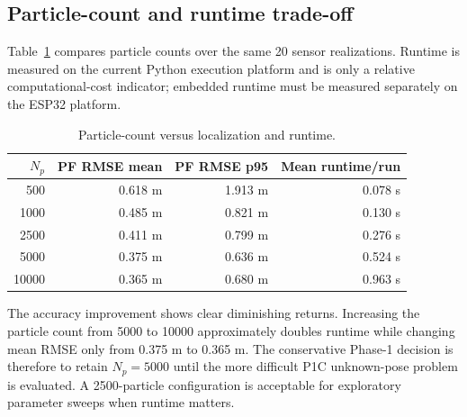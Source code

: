 \subsection{Particle-count and runtime trade-off}
Table~\ref{tab:p1b_particles} compares particle counts over the same 20 sensor realizations. Runtime is measured on the current Python execution platform and is only a relative computational-cost indicator; embedded runtime must be measured separately on the ESP32 platform.
\begin{table}[ht]
\centering
\caption{Particle-count versus localization and runtime.}
\label{tab:p1b_particles}
\begin{tabular}{rrrr}
\toprule
$N_p$ & PF RMSE mean & PF RMSE p95 & Mean runtime/run\\
\midrule
500 & 0.618 m & 1.913 m & 0.078 s\\
1000 & 0.485 m & 0.821 m & 0.130 s\\
2500 & 0.411 m & 0.799 m & 0.276 s\\
5000 & 0.375 m & 0.636 m & 0.524 s\\
10000 & 0.365 m & 0.680 m & 0.963 s\\
\bottomrule
\end{tabular}
\end{table}
The accuracy improvement shows clear diminishing returns. Increasing the particle count from 5000 to 10000 approximately doubles runtime while changing mean RMSE only from 0.375 m to 0.365 m. The conservative Phase-1 decision is therefore to retain $N_p=5000$ until the more difficult P1C unknown-pose problem is evaluated. A 2500-particle configuration is acceptable for exploratory parameter sweeps when runtime matters.


